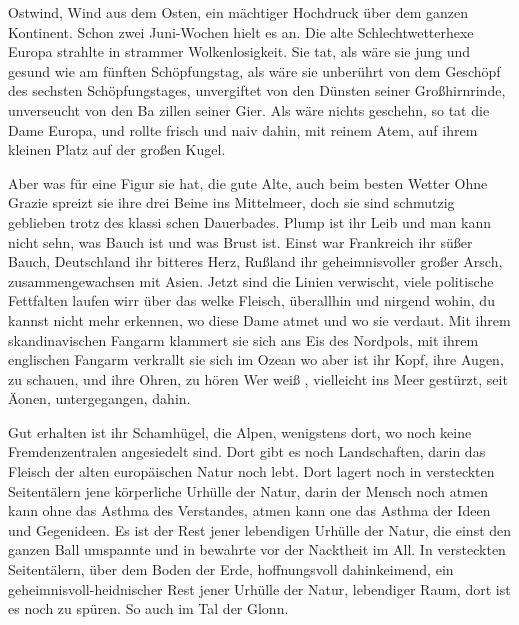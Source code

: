 

Ostwind, Wind aus dem Osten, ein mächtiger Hochdruck über
dem ganzen Kontinent. Schon zwei Juni-Wochen hielt es an.
Die alte Schlechtwetterhexe Europa strahlte in strammer
Wolkenlosigkeit. Sie tat, als wäre sie jung und ge\-sund wie
am fünften Schöpfungstag, als wäre sie unberührt von dem
Geschöpf des sechsten Schöpfungstages, unvergiftet von den
Dünsten seiner Großhirnrinde, unverseucht von den Ba\-%
zillen seiner Gier. Als wäre nichts geschehn, so tat die Dame
Europa, und rollte frisch und naiv dahin, mit reinem Atem,
auf ihrem kleinen Platz auf der großen Kugel.

Aber was für eine Figur sie hat, die gute Alte, auch beim
besten Wetter\ausr{} Ohne Grazie spreizt sie ihre drei Beine ins
Mittelmeer, doch sie sind schmutzig geblieben trotz des klassi\-%
schen Dauerbades. Plump ist ihr Leib und man kann nicht
sehn, was Bauch ist und was Brust ist. Einst war Frankreich
ihr süßer Bauch, Deutschland ihr bitteres Herz, Rußland ihr
geheimnisvoller großer Arsch, zusammengewachsen mit Asien.
Jetzt sind die Linien verwischt, viele politische Fettfalten
laufen wirr über das welke Fleisch, überallhin und nirgend\-%
wohin, du kannst nicht mehr erkennen, wo diese Dame atmet
und wo sie verdaut. Mit ihrem skandinavischen Fangarm
klammert sie sich ans Eis des Nordpols, mit ihrem englischen
Fangarm verkrallt sie sich im Ozean\dopp{} wo aber ist ihr Kopf,
ihre Augen, zu schauen, und ihre Ohren, zu hören\frag{} Wer weiß%
\eingriff{weiß, vielleicht ] weiß vielleicht},
vielleicht ins Meer gestürzt, seit Äonen, untergegangen,
dahin.

Gut erhalten ist ihr Schamhügel, die Alpen, wenigstens dort,
wo noch keine Fremdenzentralen angesiedelt sind. Dort gibt
es noch Landschaften, darin das Fleisch der alten europäischen
Natur noch lebt. Dort lagert noch in versteckten Seitentälern
jene körperliche Urhülle der Natur, darin der Mensch noch
atmen kann ohne das Asthma des Verstandes, atmen kann
one das Asthma der Ideen und Gegenideen. Es ist der Rest
jener lebendigen Urhülle der Natur, die einst den ganzen
Ball umspannte und in bewahrte vor der Nacktheit im All.
In versteckten Seitentälern, über dem Boden der Erde,
hoffnungsvoll dahinkeimend, ein geheimnisvoll-heidnischer
Rest jener Urhülle der Natur, lebendiger Raum, dort ist es
noch zu spüren. So auch im Tal der Glonn.

